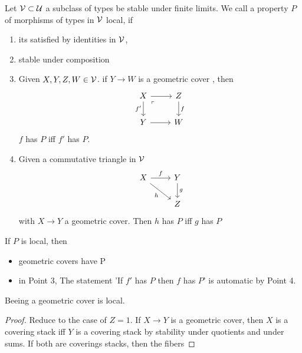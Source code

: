 \documentclass{article}
\begin{document}
\begin{definition}
	Let $\mathcal{V} \subset \mathcal{U}$ a subclass of types be stable under finite limits. 
	We call a property $P$ of morphisms of types in $\mathcal{V}$ local, if 
	\begin{enumerate}
		\item its satisfied by identities in $\mathcal{V}$,
		\item stable under composition 
		\item Given $X,Y,Z,W \in \mathcal{V}$. if $Y \to W$ is a geometric cover , then 
			\[\begin{tikzcd}
				X & Z \\
				Y & W
				\arrow[from=1-1, to=1-2]
				\arrow["{f'}"', from=1-1, to=2-1]
				\arrow["\ulcorner"{anchor=center, pos=0.125}, draw=none, from=1-1, to=2-2]
				\arrow["f", from=1-2, to=2-2]
				\arrow[from=2-1, to=2-2]
			\end{tikzcd}\]
		$f$ has $P$ iff $f'$ has $P$.
		\item
	Given a commutative triangle in $\mathcal{V}$%
	\[\begin{tikzcd}
		X & Y \\
		& Z
		\arrow["f", from=1-1, to=1-2]
		\arrow["h"', from=1-1, to=2-2]
		\arrow["g", from=1-2, to=2-2]
	\end{tikzcd}\]
with $X \to Y$ a geometric cover. Then $h$ has $P$ iff $g$ has $P$
\end{enumerate}
\begin{lemma}{\label{lemma:local}}
	If $P$ is local, then 
	\begin{itemize}
		\item geometric covers have P
		\item in Point 3, The statement 'If $f'$ has $P$ then $f$ has $P$' is automatic by Point 4.
	\end{itemize}
\end{lemma}
\end{definition}
\begin{lemma}
	Beeing a geometric cover is local.
\end{lemma}
\begin{proof}
	Reduce to the case of $Z = 1$. If $X \to Y$ is a geometric cover, then $X$ is a covering stack iff $Y$ is a covering stack by stability under quotients and under sums. If both are coverings stacks, then the fibers 
\end{proof}
\end{document}
